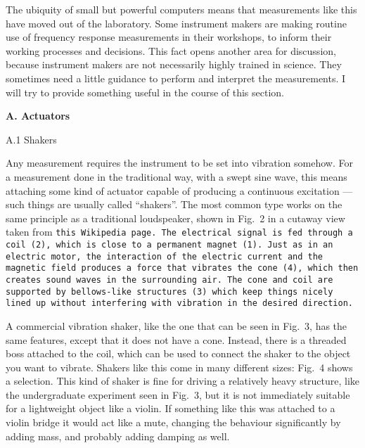   The ubiquity of small but powerful computers means that measurements like 
  this have moved out of the laboratory. Some instrument makers are making 
  routine use of frequency response measurements in their workshops, to inform 
  their working processes and decisions. This fact opens another area for 
  discussion, because instrument makers are not necessarily highly trained in 
  science. They sometimes need a little guidance to perform and interpret the 
  measurements. I will try to provide something useful in the course of this 
  section. 

  \textbf{A. Actuators } 

  A.1 Shakers 

  Any measurement requires the instrument to be set into vibration somehow. For 
  a measurement done in the traditional way, with a swept sine wave, this means 
  attaching some kind of actuator capable of producing a continuous excitation 
  — such things are usually called “shakers”. The most common type works on the 
  same principle as a traditional loudspeaker, shown in Fig.\ 2 in a cutaway 
  view taken from \tt{}this Wikipedia page\rm{}. The electrical signal is fed 
  through a coil (2), which is close to a permanent magnet (1). Just as in an 
  electric motor, the interaction of the electric current and the magnetic 
  field produces a force that vibrates the cone (4), which then creates sound 
  waves in the surrounding air. The cone and coil are supported by bellows-like 
  structures (3) which keep things nicely lined up without interfering with 
  vibration in the desired direction. 


  A commercial vibration shaker, like the one that can be seen in Fig.\ 3, has 
  the same features, except that it does not have a cone. Instead, there is a 
  threaded boss attached to the coil, which can be used to connect the shaker 
  to the object you want to vibrate. Shakers like this come in many different 
  sizes: Fig.\ 4 shows a selection. This kind of shaker is fine for driving a 
  relatively heavy structure, like the undergraduate experiment seen in Fig.\ 
  3, but it is not immediately suitable for a lightweight object like a violin. 
  If something like this was attached to a violin bridge it would act like a 
  mute, changing the behaviour significantly by adding mass, and probably 
  adding damping as well. 


